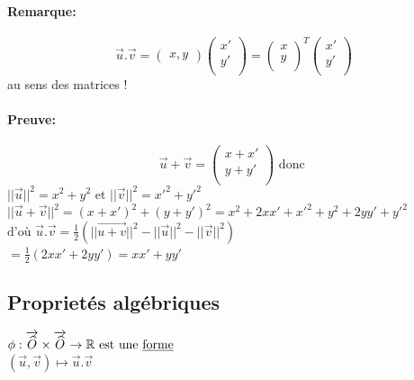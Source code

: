 \documentclass{article}
\newcommand\tab[1][1cm]{\hspace*{#1}}
\begin{document}
\paragraph{Remarque:}

$$
\vec{u} . \vec{v} = 
\begin{pmatrix}
    x, y
\end{pmatrix}
\begin{pmatrix}
    x'\\
    y'\\
\end{pmatrix}
=
\begin{pmatrix}
    x\\
    y\\
\end{pmatrix}^T
\begin{pmatrix}
    x'\\
    y'\\
\end{pmatrix}
$$
au sens des matrices !

\paragraph{Preuve:}

$$
\vec{u} + \vec{v} = 
\begin{pmatrix}
    x + x'\\
    y + y'\\
\end{pmatrix}
\mbox{ donc }
$$
$||\vec{u}||^2 = x^2 + y^2 \mbox{ et } ||\vec{v}||^2 = x'^2 + y'^2$ \\
$||\vec{u} + \vec{v}||^2 = (x + x')^2 + (y + y')^2 = x^2 + 2xx' + x'^2 + y^2 + 2yy' + y'^2$ \\
$\mbox{d'où } \vec{u} . \vec{v} = \frac{1}{2}(||\vec{u + v}||^2 - ||\vec{u}||^2 - ||\vec{v}||^2)$ \\
\tab[1.4cm]$= \frac{1}{2}(2xx' + 2yy') = xx' + yy'$

\subsection{Proprietés algébriques}

$\phi : \overrightarrow{\widehat{O}} \times \overrightarrow{\widehat{O}} \rightarrow \mathbb{R} \mbox{ est une \underline{forme}}$ \\
\tab[0.5cm]$(\vec{u}, \vec{v}) \longmapsto \vec{u} . \vec{v}$
\end{document}
